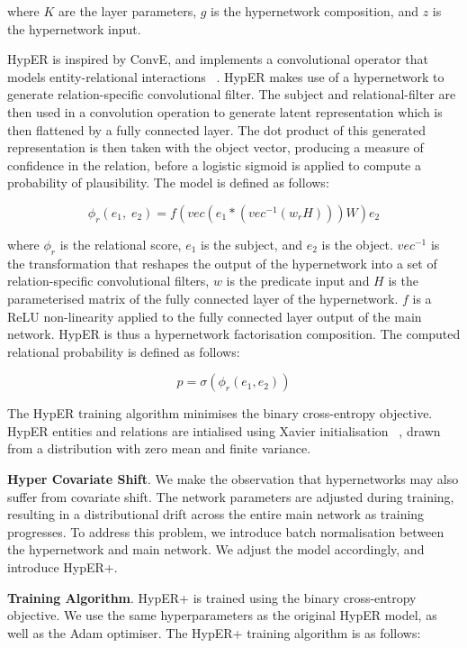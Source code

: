 where $K$ are the layer parameters, $g$ is the hypernetwork composition, and $z$ is the hypernetwork input. \bigskip

HypER is inspired by ConvE, and implements a convolutional operator that models entity-relational interactions ~\citep{balazevic2019hypernetwork}. HypER makes use of a hypernetwork to generate relation-specific convolutional filter. The subject and relational-filter are then used in a convolution operation to generate latent representation which is then flattened by a fully connected layer. The dot product of this generated representation is then taken with the object vector, producing a measure of confidence in the relation, before a logistic sigmoid is applied to compute a probability of plausibility. The model is defined as follows: 

\begin{equation}
	\phi_r(e_1, \; e_2) = f(vec(e_1 * (vec^{-1}(w_rH)))W)e_2
\end{equation}

where $\phi_r$ is the relational score, $e_1$ is the subject, and $e_2$ is the object. $vec^{-1}$ is the transformation that reshapes the output of the hypernetwork into a set of relation-specific convolutional filters, $w$ is the predicate input and $H$ is the parameterised matrix of the fully connected layer of the hypernetwork. $f$ is a ReLU non-linearity applied to the fully connected layer output of the main network. HypER is thus a hypernetwork factorisation composition. The computed relational probability is defined as follows: 

\begin{equation}
	p = \sigma(\phi_r(e_1,e_2)) 
\end{equation}

The HypER training algorithm minimises the binary cross-entropy objective. HypER entities and relations are intialised using Xavier initialisation ~\citep{glorot2010understanding}, drawn from a distribution with zero mean and finite variance. \newpage

\textbf{Hyper Covariate Shift}. We make the observation that hypernetworks may also suffer from covariate shift. The network parameters are adjusted during training, resulting in a distributional drift across the entire main network as training progresses. To address this problem, we introduce batch normalisation between the hypernetwork and main network. We adjust the model accordingly, and introduce HypER+. \bigskip 

\textbf{Training Algorithm}. HypER+ is trained using the binary cross-entropy objective. We use the same hyperparameters as the original HypER model, as well as the Adam optimiser. The HypER+ training algorithm is as follows: \newline

